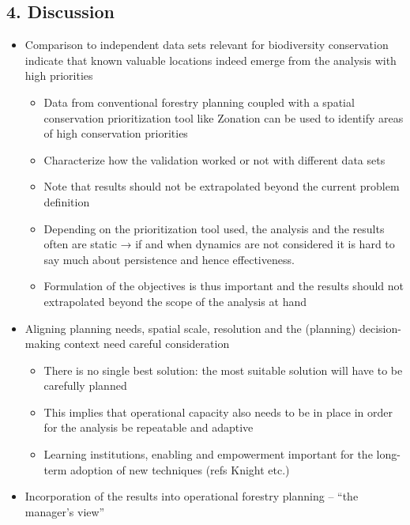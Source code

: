 \documentclass[]{article}
\begin{document}
\subsection{4. Discussion}

\begin{itemize}
\itemsep1pt\parskip0pt
\item
  Comparison to independent data sets relevant for biodiversity
  conservation indicate that known valuable locations indeed emerge from
  the analysis with high priorities

  \begin{itemize}
  \itemsep1pt\parskip0pt
  \item
    Data from conventional forestry planning coupled with a spatial
    conservation prioritization tool like Zonation can be used to
    identify areas of high conservation priorities
  \item
    Characterize how the validation worked or not with different data
    sets
  \item
    Note that results should not be extrapolated beyond the current
    problem definition
  \item
    Depending on the prioritization tool used, the analysis and the
    results often are static → if and when dynamics are not considered
    it is hard to say much about persistence and hence effectiveness.
  \item
    Formulation of the objectives is thus important and the results
    should not extrapolated beyond the scope of the analysis at hand
  \end{itemize}
\item
  Aligning planning needs, spatial scale, resolution and the (planning)
  decision-making context need careful consideration

  \begin{itemize}
  \itemsep1pt\parskip0pt
  \item
    There is no single best solution: the most suitable solution will
    have to be carefully planned
  \item
    This implies that operational capacity also needs to be in place in
    order for the analysis be repeatable and adaptive
  \item
    Learning institutions, enabling and empowerment important for the
    long-term adoption of new techniques (refs Knight etc.)
  \end{itemize}
\item
  Incorporation of the results into operational forestry planning --
  ``the manager's view''


\end{itemize}
\end{document}
